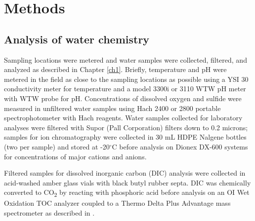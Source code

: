 
\section{Methods}
\subsection{Analysis of water chemistry}
Sampling locations were metered and water samples were collected, filtered, and analyzed as described in Chapter \ref{ch1}. Briefly, temperature and pH were metered in the field as close to the sampling locations as possible using a YSI 30 conductivity meter for temperature and a model 3300i or 3110 WTW pH meter with WTW probe for pH. Concentrations of dissolved oxygen and sulfide were measured in unfiltered water samples using Hach 2400 or 2800 portable spectrophotometer with Hach reagents. Water samples collected for laboratory analyses were filtered with Supor (Pall Corporation) filters down to 0.2 microns; samples for ion chromatography were collected in 30 mL HDPE Nalgene bottles (two per sample) and stored at -20$^{\circ}$C before analysis on Dionex DX-600 systems for concentrations of major cations and anions.

Filtered samples for dissolved inorganic carbon (DIC) analysis were collected in acid-washed amber glass vials with black butyl rubber septa. DIC was chemically converted to CO\textsubscript{2} by reacting with phosphoric acid before analysis on an OI Wet Oxidation TOC analyzer coupled to a Thermo Delta Plus Advantage mass spectrometer as described in \cite{havig2011merging}.

